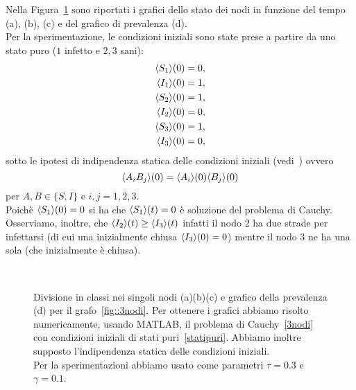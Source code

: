 Nella Figura~\ref{fig::spe3nodi} sono riportati i grafici dello stato dei nodi in funzione del tempo (a), (b), (c) e del grafico di prevalenza (d).\\
Per la sperimentazione, le condizioni iniziali sono state prese a partire da uno stato puro ($1$ infetto e $2,3$ sani):
\begin{equation}
\label{statipuri}
\begin{aligned}
\langle S_1 \rangle(0)&=0, \\
\langle I_1 \rangle(0) &=1, \\
\langle S_2 \rangle(0)&=1,\\
\langle I_2 \rangle(0)& = 0,\\ 
\langle S_3 \rangle(0)&= 1,\\
\langle I_3 \rangle(0) &= 0,\\
\end{aligned}
\end{equation}
sotto le ipotesi di indipendenza statica delle condizioni iniziali (vedi~\cite{MR3340258}) ovvero
$$
\langle A_i B_j \rangle(0) =\langle A_i \rangle(0) \langle B_j \rangle(0)$$ 
per $A,B\in \{ S, I\}$ e  $i,j=1, 2,3$.\\

Poich\`e $\langle S_1 \rangle(0)=0$ si ha che $\langle S_1 \rangle(t)=0$ \`e soluzione del problema di Cauchy.  Osserviamo,  inoltre, che $\langle I_2 \rangle(t)\geq \langle I_3 \rangle(t)$ infatti il nodo $2$ ha due strade per infettarsi (di cui una inizialmente chiusa $\langle I_3 \rangle(0)=0$) mentre il nodo $3$ ne ha una sola (che inizialmente \`e chiusa). 
\begin{figure}[h]
\centering
\subfloat[][Nodo 1]
{\resizebox{0.45\textwidth}{!}{}}
 \quad 
\subfloat[][Nodo 2]
{\resizebox{0.45\textwidth}{!}{ }}
\\
\subfloat[][Nodo 3]
{\resizebox{0.45\textwidth}{!}
{}
}
\quad
\subfloat[][Prevalenza]
{\resizebox{0.45\textwidth}{!}
{}
}
\caption[Sperimentazione in MATLAB relativo al grafo~\ref{fig::3nodi}]{Divisione in classi nei singoli nodi (a)(b)(c) e grafico della prevalenza (d) per il grafo~\ref{fig::3nodi}.   Per ottenere i grafici abbiamo risolto numericamente,  usando MATLAB,  il problema di Cauchy~\eqref{3nodi} con condizioni iniziali  di stati puri~\eqref{statipuri}.  Abbiamo inoltre supposto l'indipendenza statica delle condizioni iniziali.\\
Per la sperimentazioni abbiamo usato come parametri $\tau= 0.3$ e $\gamma =0.1 $.}\label{fig::spe3nodi}
\end{figure}




